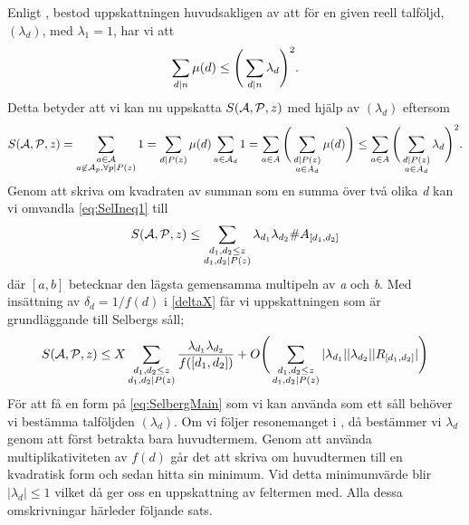Enligt \cite{cojocarumurty}, bestod uppskattningen huvudsakligen av att för en given reell talföljd, \((\lambda_d)\), med \(\lambda_1 = 1\), har vi att 
\begin{equation}
    \sum_{d\divides n}\mu(d) \leq \Bigg(\sum_{d\divides n}\lambda_d\Bigg)^2.\nonumber
\end{equation}
Detta betyder att vi kan nu uppskatta \(\S{A}{P}{z}\) med hjälp av \((\lambda_d)\) eftersom
\begin{equation}
\S{A}{P}{z} = \sum_{\substack{a\in \mathcal{A}\\a\not\in\mathcal{A}_p,\forall p\divides P(z)}} 1 = \sum_{d\divides P(z)} \mu(d) \sum_{a\in\mathcal{A}_d}1 = \sum_{a\in A} \Bigg(\sum_{\substack{d\divides P(z)\\a\in A_d}}\mu(d)\Bigg)\leq \sum_{a\in A}\Bigg(\sum_{\substack{d\divides P(z)\\a\in A_d}}\lambda_d\Bigg)^2.\label{eq:SelIneq1}
\end{equation}
Genom att skriva om kvadraten av summan som en summa över två olika \textit{d} kan vi omvandla \eqref{eq:SelIneq1} till
\begin{equation}
    \S{A}{P}{z} \leq \sum_{\substack{d_1,d_2\leq z\\d_1,d_2\divides P(z)}}\lambda_{d_1}\lambda_{d_2}\#A_{[d_1, d_2]}\nonumber
\end{equation}
där \([a, b]\) betecknar den lägsta gemensamma multipeln av \textit{a} och \textit{b}. Med insättning av \(\delta_d = 1/f(d)\) i \eqref{deltaX} får vi uppskattningen som är grundläggande  till Selbergs såll;
\begin{equation}
    \S{A}{P}{z} \leq X\sum_{\substack{d_1,d_2\leq z\\d_1,d_2\divides P(z)}}\frac{\lambda_{d_1}\lambda_{d_2}}{f([d_1,d_2])} + O\Bigg(\sum_{\substack{d_1,d_2\leq z\\d_1,d_2\divides P(z)}}|\lambda_{d_1}||\lambda_{d_2}||R_{[d_1, d_2]}|\Bigg)\label{eq:SelbergMain}
\end{equation}
För att få en form på \eqref{eq:SelbergMain} som vi kan använda som ett såll behöver vi bestämma talföljden \((\lambda_d)\). Om vi följer resonemanget i \cite{cojocarumurty}, då bestämmer vi \(\lambda_d\) genom att först betrakta bara huvudtermem. Genom att använda multiplikativiteten av \(f(d)\) går det att skriva om huvudtermen till en kvadratisk form och sedan hitta sin minimum. Vid detta minimumvärde blir \(|\lambda_d|\leq 1\) vilket då ger oss en uppskattning av feltermen med. Alla dessa omskrivningar härleder följande sats.

